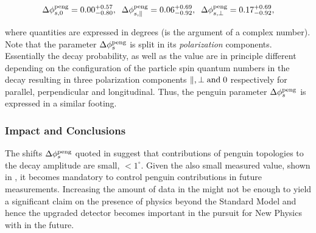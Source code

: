 \begin{equation}
\label{app_delta_phis_result}
  \Delta\phi^{\rm peng}_{s,{0}}         = 0.00 ^{+0.57}_{-0.80}, \;\;
  \Delta\phi^{\rm peng}_{s,{\parallel}} = 0.06 ^{+0.69}_{-0.92}, \;\;
  \Delta\phi^{\rm peng}_{s,{\perp}}     = 0.17 ^{+0.69}_{-0.92},
\end{equation}

\noindent where quantities are expressed in degrees (\phis is the argument of a complex number).
Note that the parameter $\Delta\phi_{s}^{\tiny\text{peng}}$ is split in its {\it polarization}
components. Essentially the \BsJpsiPhi decay probability, as well as the \phis value
are in principle different depending on the configuration of the particle spin
quantum numbers in the \BsJpsiPhi decay resulting in three polarization components
$\parallel,\perp {\rm and}\; 0$ respectively for parallel, perpendicular and longitudinal.
Thus, the penguin parameter $\Delta\phi_{s}^{\tiny\text{peng}}$ is expressed in a similar footing.


\subsubsection{Impact and Conclusions}

The shifts $\Delta\phi_{s}^{\tiny\text{peng}}$ quoted in 
suggest that contributions of penguin topologies to the \BsJpsiPhi decay amplitude are
small, $<1^\circ$. Given the also small \phis measured value, shown in ,
it becomes mandatory to control penguin contributions in future \phis measurements.
Increasing the amount of data in the \lhc \runtwo might not be enough to yield
a significant claim on the presence of physics beyond the Standard Model and hence
the upgraded \lhcb detector becomes important in the pursuit for New Physics with
\phis in the future.

%
%
%
